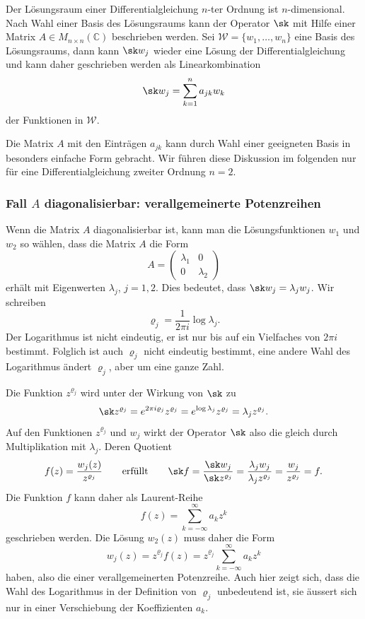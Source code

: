Der Lösungsraum einer Differentialgleichung $n$-ter Ordnung
ist $n$-dimensional.
Nach Wahl einer Basis des Lösungsraums kann der Operator $\sk$
mit Hilfe einer Matrix $A\in M_{n\times n}(\mathbb{C})$ beschrieben werden.
Sei $\mathscr{W}=\{w_1,\dots,w_n\}$ eine Basis des Lösungsraums, dann
kann $\sk w_j$ wieder eine Lösung der Differentialgleichung
und kann daher geschrieben werden als Linearkombination
\begin{equation}
\sk w_j
=
\sum_{k=1}^n
a_{jk} w_k
\end{equation}
der Funktionen in $\mathscr{W}$.

Die Matrix $A$ mit den Einträgen $a_{jk}$ kann durch Wahl einer
geeigneten Basis in besonders einfache Form gebracht.
Wir führen diese Diskussion im folgenden nur für eine Differentialgleichung
zweiter Ordnung $n=2$.

%
%
\subsubsection{Fall $A$ diagonalisierbar: verallgemeinerte Potenzreihen}
Wenn die Matrix $A$ diagonalisierbar ist,
kann man die Lösungsfunktionen $w_1$ und $w_2$ so
wählen, dass die Matrix $A$ die Form
\[
A=\begin{pmatrix}\lambda_1&0\\0&\lambda_2\end{pmatrix}
\]
erhält mit Eigenwerten $\lambda_j$, $j=1,2$.
Dies bedeutet, dass $\sk w_j = \lambda_j w_j$.
Wir schreiben
\[
\varrho_j = \frac{1}{2\pi i} \log\lambda_j.
\]
Der Logarithmus ist nicht eindeutig, er ist nur bis auf ein Vielfaches
von $2\pi i$ bestimmt.
Folglich ist auch $\varrho_j$ nicht eindeutig bestimmt, eine
andere Wahl des Logarithmus ändert $\varrho_j$, aber um eine ganze Zahl.

Die Funktion $z^{\varrho_j}$ wird unter der Wirkung von $\sk$ zu
\[
\sk z^{\varrho_j}
=
e^{2\pi i\varrho_j} z^{\varrho_j}
=
e^{\log \lambda_j} z^{\varrho_j}
=
\lambda_j z^{\varrho_j}.
\]
Auf den Funktionen $z^{\varrho_j}$ und $w_j$ wirkt der Operator $\sk$
also die gleich durch Multiplikation mit $\lambda_j$.
Deren Quotient
\[
f(z) = \frac{w_j(z)}{z^{\varrho_j}}
\qquad\text{erfüllt}\qquad
\sk f
=
\frac{\sk w_j}{\sk z^{\varrho_j}}
=
\frac{\lambda_j w_j}{\lambda_j z^{\varrho_j}}
=
\frac{w_j}{z^{\varrho_j}}
=
f.
\]
Die Funktion $f$ kann daher als Laurent-Reihe
\[
f(z) 
=
\sum_{k=-\infty}^\infty a_kz^k
\]
geschrieben werden.
Die Lösung $w_2(z)$ muss daher die Form
\begin{equation}
w_j(z)
=
z^{\varrho_j} f(z)
=
z^{\varrho_j} \sum_{k=-\infty}^\infty a_kz^k
\end{equation}
haben, also die einer verallgemeinerten Potenzreihe.
Auch hier zeigt sich, dass die Wahl des Logarithmus in der Definition
von $\varrho_j$ unbedeutend ist, sie äussert sich nur in einer
Verschiebung der Koeffizienten $a_k$.

